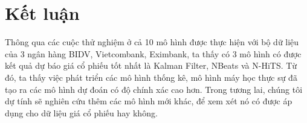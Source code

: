 \section{Kết luận}
Thông qua các cuộc thử nghiệm ở cả 10 mô hình được thực hiện với bộ dữ liệu của 3 ngân hàng BIDV, Vietcombank, Eximbank, ta thấy có 3 mô hình có được kết quả dự báo giá cổ phiếu tốt nhất là Kalman Filter, NBeats và N-HiTS. Từ đó, ta thấy việc phát triển các mô hình thống kê, mô hình máy học thực sự đã tạo ra các mô hình dự đoán có độ chính xác cao hơn. Trong tương lai, chúng tôi dự tính sẽ nghiên cứu thêm các mô hình mới khác, để xem xét nó có được áp dụng cho dữ liệu giá cổ phiếu hay không.
